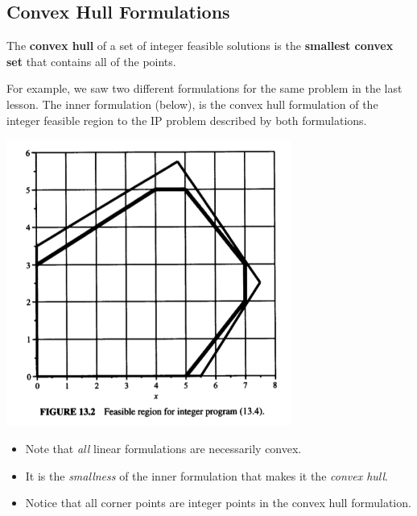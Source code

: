 \documentclass[11pt]{article}
\theoremstyle{definition}
\newcommand{\answerbox}[3]{%
  \fbox{%
    \begin{minipage}[#1]{#2}
      \hfill\vspace{#3}
    \end{minipage}
  }
}
\newcommand{\answerboxfull}[2]{%
  \answerbox{#1}{6.38in}{#2} 
}
\begin{document}
\answerboxfull{c}{.5in}



\subsection{Convex Hull Formulations}

\begin{tcolorbox}
The \textbf{convex hull} of a set of integer feasible solutions is the \textbf{smallest convex set} that contains all of the points. 
\end{tcolorbox}

For example, we saw two different formulations for the same problem in the last lesson.  The inner formulation (below), is the convex hull formulation of the integer feasible region to the IP problem described by both formulations.  

\begin{minipage}{0.4\textwidth}
\includegraphics[width=0.7\textwidth]{formulation_ideal}
\end{minipage}
\begin{minipage}{0.6\textwidth}
\begin{itemize}
\item Note that \emph{all} linear formulations are necessarily convex.
\item It is the \emph{smallness} of the inner formulation that makes it the \emph{convex hull}. 
\item Notice that all corner points are integer points in the convex hull formulation.
\end{itemize}
\end{minipage}
\end{document}
